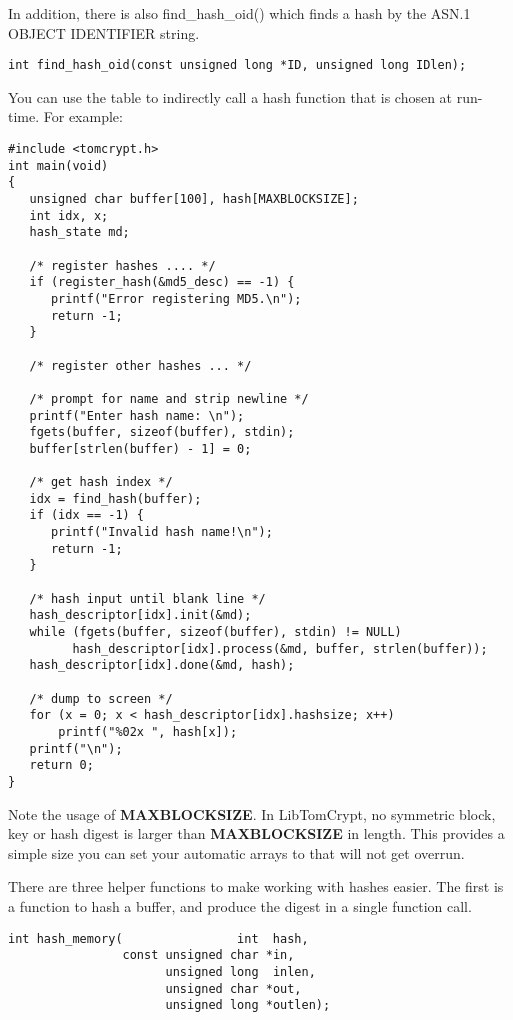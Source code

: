 \documentclass[synpaper]{book}
\begin{document}
In addition, there is also find\_hash\_oid() which finds a hash by the ASN.1 OBJECT IDENTIFIER string.
\begin{verbatim}
int find_hash_oid(const unsigned long *ID, unsigned long IDlen);
\end{verbatim}

You can use the table to indirectly call a hash function that is chosen at run-time.  For example:
\begin{small}
\begin{verbatim}
#include <tomcrypt.h>
int main(void)
{
   unsigned char buffer[100], hash[MAXBLOCKSIZE];
   int idx, x;
   hash_state md;

   /* register hashes .... */
   if (register_hash(&md5_desc) == -1) {
      printf("Error registering MD5.\n");
      return -1;
   }

   /* register other hashes ... */

   /* prompt for name and strip newline */
   printf("Enter hash name: \n");
   fgets(buffer, sizeof(buffer), stdin);
   buffer[strlen(buffer) - 1] = 0;

   /* get hash index */
   idx = find_hash(buffer);
   if (idx == -1) {
      printf("Invalid hash name!\n");
      return -1;
   }

   /* hash input until blank line */
   hash_descriptor[idx].init(&md);
   while (fgets(buffer, sizeof(buffer), stdin) != NULL)
         hash_descriptor[idx].process(&md, buffer, strlen(buffer));
   hash_descriptor[idx].done(&md, hash);

   /* dump to screen */
   for (x = 0; x < hash_descriptor[idx].hashsize; x++)
       printf("%02x ", hash[x]);
   printf("\n");
   return 0;
}
\end{verbatim}
\end{small}

Note the usage of \textbf{MAXBLOCKSIZE}.  In LibTomCrypt, no symmetric block, key or hash digest is larger than \textbf{MAXBLOCKSIZE} in
length.  This provides a simple size you can set your automatic arrays to that will not get overrun.

There are three helper functions to make working with hashes easier.  The first is a function to hash a buffer, and produce the digest in a single
function call.

\begin{verbatim}
int hash_memory(                int  hash, 
                const unsigned char *in,   
                      unsigned long  inlen, 
                      unsigned char *out,  
                      unsigned long *outlen);
\end{verbatim}
\end{document}
